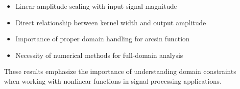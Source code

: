 \begin{itemize}
\item Linear amplitude scaling with input signal magnitude
\item Direct relationship between kernel width and output amplitude
\item Importance of proper domain handling for arcsin function
\item Necessity of numerical methods for full-domain analysis
\end{itemize}

These results emphasize the importance of understanding domain constraints when working with nonlinear functions in signal processing applications.
